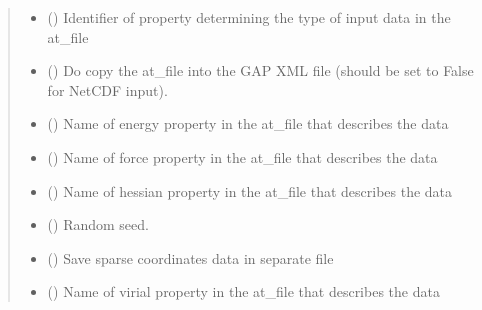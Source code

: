 \documentclass[letterpaper,10pt,english]{sphinxmanual}
\begin{document}
\begin{fulllineitems}
\begin{fulllineitems}
\begin{quote}
\begin{description}
\begin{itemize}
\item {} 
 () \textendash{} Identifier of property determining the type of input data in the at\_file

\item {} 
 () \textendash{} Do copy the at\_file into the GAP XML file (should be set to False for NetCDF input).

\item {} 
 () \textendash{} Name of energy property in the at\_file that describes the data

\item {} 
 () \textendash{} Name of force property in the at\_file that describes the data

\item {} 
 () \textendash{} Name of hessian property in the at\_file that describes the data

\item {} 
 () \textendash{} Random seed.

\item {} 
 () \textendash{} Save sparse coordinates data in separate file

\item {} 
 () \textendash{} Name of virial property in the at\_file that describes the data

\end{itemize}

\end{description}\end{quote}

\end{fulllineitems}


\end{fulllineitems}
\end{document}
